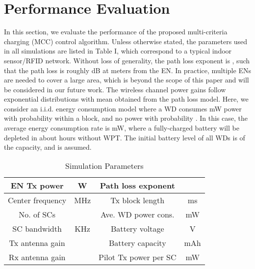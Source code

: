 \documentclass[conference]{IEEEtran}
\begin{document}
\section{Performance Evaluation}
In this section, we evaluate the performance of the proposed multi-criteria charging (MCC) control algorithm. Unless otherwise stated, the parameters used in all simulations are listed in Table I, which correspond to a typical indoor sensor/RFID network. Without loss of generality, the path loss exponent is , such that the path loss is roughly  dB at  meters from the EN. In practice, multiple ENs are needed to cover a large area, which is beyond the scope of this paper and will be considered in our future work. The wireless channel power gains follow exponential distributions with mean obtained from the path loss model. Here, we consider an i.i.d. energy consumption model where a WD consumes  mW power with probability  within a block, and no power with probability . In this case, the average energy consumption rate is  mW, where a fully-charged battery will be depleted in about  hours without WPT. The initial battery level of all WDs is  of the capacity, and  is assumed.

\begin{table}
\caption{Simulation Parameters}
\footnotesize
\begin{center}
\begin{tabular}{|c|c||c|c|}
 \hline
  EN Tx power &    W & Path loss exponent &   \\ \hline
  Center frequency &    MHz &  Tx block length &    ms \\ \hline
  No. of SCs &     & Ave. WD power cons.&    mW\\ \hline
  SC bandwidth &    KHz   & Battery voltage &    V\\ \hline
  Tx antenna gain &     & Battery capacity &    mAh\\ \hline
  Rx antenna gain &     & Pilot Tx power per SC &    mW\\ \hline
\end{tabular}
\end{center}
\label{stat}
\end{table}
\end{document}
